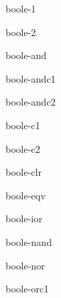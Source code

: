 \begin{constant}{boole-1}{}{}{}
  
\end{constant}

\begin{constant}{boole-2}{}{}{}
  
\end{constant}

\begin{constant}{boole-and}{}{}{}
  
\end{constant}

\begin{constant}{boole-andc1}{}{}{}
  
\end{constant}

\begin{constant}{boole-andc2}{}{}{}
  
\end{constant}

\begin{constant}{boole-c1}{}{}{}
  
\end{constant}

\begin{constant}{boole-c2}{}{}{}
  
\end{constant}

\begin{constant}{boole-clr}{}{}{}
  
\end{constant}

\begin{constant}{boole-eqv}{}{}{}
  
\end{constant}

\begin{constant}{boole-ior}{}{}{}
  
\end{constant}

\begin{constant}{boole-nand}{}{}{}
  
\end{constant}

\begin{constant}{boole-nor}{}{}{}
  
\end{constant}

\begin{constant}{boole-orc1}{}{}{}
  
\end{constant}

